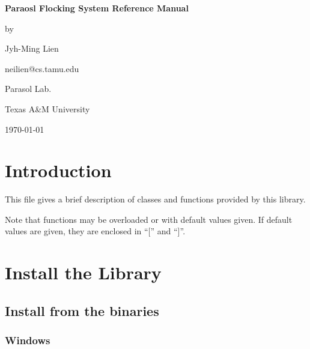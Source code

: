 \documentclass[onecolumn,10pt]{article}
\def\thefootnote{\fnsymbol{footnote}}
\begin{document}
\begin{titlepage}
\begin{center}

{\Large\bf Paraosl Flocking System Reference Manual}

\vspace{0.5in}
\vspace{1.5in}
\centerline{by}
\vspace{1in}
\centerline{Jyh-Ming Lien}
\centerline{neilien@cs.tamu.edu}
\vspace{0.2in}

\centerline{Parasol Lab.}
\centerline{Texas A\&M University}
\vspace{0.5in}
\today

\end{center}
\end{titlepage}

\def\thefootnote{\arabic{footnote}}
\setcounter{footnote}{0}
\def\thefootnote{\arabic{footnote}}


\tableofcontents
\clearpage

\section{Introduction}

This file gives a brief description of classes and 
functions provided by this library.


Note that functions may be overloaded or with default values given.
If default values are given, they are enclosed in ``['' and ``]''.

\section{Install the Library}

\subsection{Install from the binaries}

\subsubsection{Windows}
\end{document}

